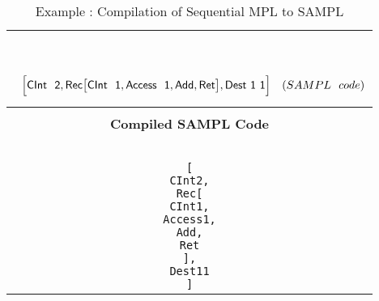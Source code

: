 \documentclass[11pt]{article}
\newcommand{\<}{\langle}
\renewcommand{\>}{\rangle}
\begin{document}
\begin{table}[!h]
\begin{center}
\begin{tabular}{|c|}
\begin{minipage}{6in}
{\begin{align*}
{  } & {} \\~~\\ 
& {
   \Big[{\sf CInt~~2},{\sf Rec}\big[{\sf CInt~~1},{\sf Access~~1,{\sf Add},{\sf Ret}}\big],{\sf Dest~1~1}\Big]
  } & {(SAMPL~~code)}   
\end{align*}
}
\end {minipage}\\ 
\hline 
{}\\
{\bf Compiled SAMPL Code} \\~~\\
\hline\hline 
\begin{minipage}{3in}
\begin{alltt}



[
  CInt 2,
  Rec [
        CInt 1,
        Access 1,
        Add,
        Ret
      ],
  Dest 1 1
]



\end{alltt}
\end{minipage}

\tabularnewline
\hline
\end{tabular}
\caption{Example : Compilation of Sequential MPL to SAMPL}
\label{AMPL:SEQMPLComp}
\end{center}
\end{table}

\end{document}
